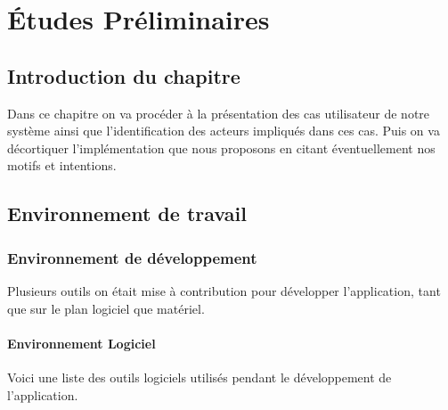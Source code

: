 
\chapter{Études Préliminaires}

\section{Introduction du chapitre}

Dans ce chapitre on va procéder à la présentation des cas utilisateur de
notre système ainsi que l'identification des acteurs impliqués dans ces
cas. Puis on va décortiquer l’implémentation que nous proposons en citant
éventuellement nos motifs et intentions.

\section{Environnement de travail}

\subsection{Environnement de développement}%
Plusieurs outils on était mise à contribution pour développer l'application, tant que sur le plan logiciel que matériel.

\subsubsection{Environnement Logiciel}
Voici une liste des outils logiciels utilisés pendant le développement de l'application.

